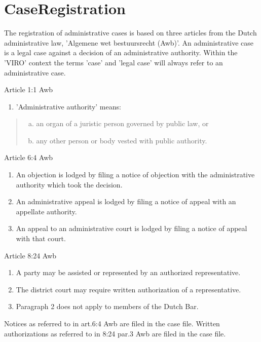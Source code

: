 \documentclass[10pt,a4paper]{report}              %
\theoremstyle{plain}\theorembodyfont{\rmfamily}\newtheorem{definition}{Definition}[section]
\theoremstyle{plain}\theorembodyfont{\rmfamily}\newtheorem{designrule}[definition]{Requirement}
\begin{document}
\section{CaseRegistration}

The registration of administrative cases is based on three articles from
the Dutch administrative law, 'Algemene wet bestuursrecht (Awb)'. An
administrative case is a legal case against a decision of an
administrative authority. Within the 'VIRO' context the terms 'case' and
'legal case' will always refer to an administrative case.

Article 1:1 Awb

\begin{enumerate}[1.]
\item
  'Administrative authority' means:
\end{enumerate}
\begin{quote}
\begin{enumerate}[a.]
\item
  an organ of a juristic person governed by public law, or
\item
  any other person or body vested with public authority.
\end{enumerate}
\end{quote}
Article 6:4 Awb

\begin{enumerate}[1.]
\item
  An objection is lodged by filing a notice of objection with the
  administrative authority which took the decision.
\item
  An administrative appeal is lodged by filing a notice of appeal with
  an appellate authority.
\item
  An appeal to an administrative court is lodged by filing a notice of
  appeal with that court.
\end{enumerate}
Article 8:24 Awb

\begin{enumerate}[1.]
\item
  A party may be assisted or represented by an authorized
  representative.
\item
  The district court may require written authorization of a
  representative.
\item
  Paragraph 2 does not apply to members of the Dutch Bar.
\end{enumerate}
Notices as referred to in art.6:4 Awb are filed in the case file.
Written authorizations as referred to in 8:24 par.3 Awb are filed in the
case file.
\end{document}
